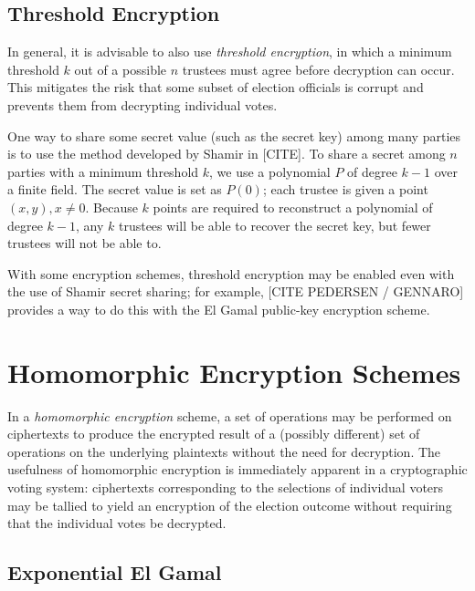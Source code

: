 \subsection{Threshold Encryption}
In general, it is advisable to also use \emph{threshold encryption}, in which a minimum threshold $k$ out of a possible $n$ trustees must agree before decryption can occur. This mitigates the risk that some subset of election officials is corrupt and prevents them from decrypting individual votes.

One way to share some secret value (such as the secret key) among many parties is to use the method developed by Shamir in [CITE]. To share a secret among $n$ parties with a minimum threshold $k$, we use a polynomial $P$ of degree $k-1$ over a finite field. The secret value is set as $P(0)$; each trustee is given a point $(x, y), x \neq 0$. Because $k$ points are required to reconstruct a polynomial of degree $k-1$, any $k$ trustees will be able to recover the secret key, but fewer trustees will not be able to.

With some encryption schemes, threshold encryption may be enabled even with the use of Shamir secret sharing; for example, [CITE PEDERSEN / GENNARO] provides a way to do this with the El Gamal public-key encryption scheme.

\section{Homomorphic Encryption Schemes}

In a \emph{homomorphic encryption} scheme, a set of operations may be performed on ciphertexts to produce the encrypted result of a (possibly different) set of operations on the underlying plaintexts without the need for decryption. The usefulness of homomorphic encryption is immediately apparent in a cryptographic voting system: ciphertexts corresponding to the selections of individual voters may be tallied to yield an encryption of the election outcome without requiring that the individual votes be decrypted.

\subsection{Exponential El Gamal}

